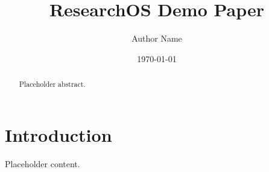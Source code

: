 \documentclass{article}
\title{ResearchOS Demo Paper}
\author{Author Name}
\date{\today}
\begin{document}
\maketitle
\begin{abstract}
Placeholder abstract.
\end{abstract}
\section{Introduction}
Placeholder content.
\end{document}
